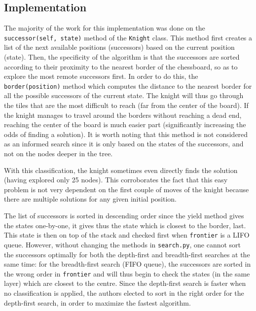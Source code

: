\documentclass[journal]{IEEEtran}
\newcommand{\py}[1]{\texttt{#1}}
\begin{document}
 \subsection{Implementation} The majority of the work for this implementation was done on the \py{successor(self, state)} method of the \py{Knight} class.
 This method first creates a list of the next available positions (successors) based on the current position (state).
 Then, the specificity of the algorithm is that the successors are sorted according to their proximity to the nearest border of the chessboard, so as to explore the most remote successors first.
 In order to do this, the \py{border(position)} method which computes the distance to the nearest border for all the possible successors of the current state.
 The knight will thus go through the tiles that are the most difficult to reach (far from the center of the board).
 If the knight manages to travel around the borders without reaching a dead end, reaching the center of the board is much easier part (significantly increasing the odds of finding a solution). It is worth noting that this method is not considered as an informed search since it is only based on the states of the successors, and not on the nodes deeper in the tree.
 
 With this classification, the knight sometimes even directly finds the solution (having explored only 25 nodes).
 This corroborates the fact that this easy problem is not very dependent on the first couple of moves of the knight because there are multiple solutions for any given initial position.
 
 The list of successors is sorted in descending order since the yield method gives the states one-by-one, it gives thus the state which is closest to the border, last.
 This state is then on top of the stack and checked first when \py{frontier} is a LIFO queue.
 However, without changing the methods in \py{search.py}, one cannot sort the successors optimally for both the depth-first and breadth-first searches at the same time: for the breadth-first search (FIFO queue), the successors are sorted in the wrong order in \py{frontier} and will thus begin to check the states (in the same layer) which are closest to the centre.
 Since the depth-first search is faster when no classification is applied, the authors elected to sort in the right order for the depth-first search, in order to maximize the fastest algorithm.
\end{document}
